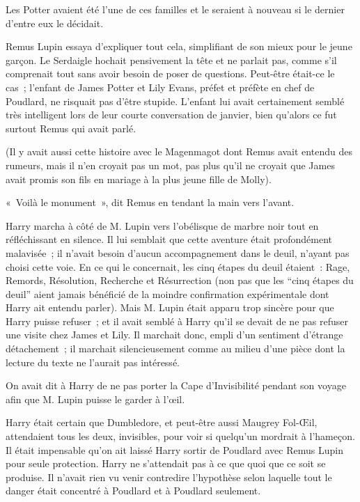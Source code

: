 Les Potter avaient été l'une de ces familles et le seraient à nouveau si le dernier d'entre eux le décidait.

Remus Lupin essaya d'expliquer tout cela, simplifiant de son mieux pour le jeune garçon. Le Serdaigle hochait pensivement la tête et ne parlait pas, comme s'il comprenait tout sans avoir besoin de poser de questions. Peut-être était-ce le cas~; l'enfant de James Potter et Lily Evans, préfet et préfète en chef de Poudlard, ne risquait pas d'être stupide. L'enfant lui avait certainement semblé très intelligent lors de leur courte conversation de janvier, bien qu'alors ce fut surtout Remus qui avait parlé.

(Il y avait aussi cette histoire avec le Magenmagot dont Remus avait entendu des rumeurs, mais il n'en croyait pas un mot, pas plus qu'il ne croyait que James avait promis son fils en mariage à la plus jeune fille de Molly).

«~Voilà le monument~», dit Remus en tendant la main vers l'avant.

\later

Harry marcha à côté de M. Lupin vers l'obélisque de marbre noir tout en réfléchissant en silence. Il lui semblait que cette aventure était profondément malavisée~; il n'avait besoin d'aucun accompagnement dans le deuil, n'ayant pas choisi cette voie. En ce qui le concernait, les cinq étapes du deuil étaient~: Rage, Remords, Résolution, Recherche et Résurrection (non pas que les “cinq étapes du deuil” aient jamais bénéficié de la moindre confirmation expérimentale dont Harry ait entendu parler). Mais M. Lupin était apparu trop sincère pour que Harry puisse refuser~; et il avait semblé à Harry qu'il se devait de ne pas refuser une visite chez James et Lily. Il marchait donc, empli d'un sentiment d'étrange détachement~; il marchait silencieusement comme au milieu d'une pièce dont la lecture du texte ne l'aurait pas intéressé.

On avait dit à Harry de ne pas porter la Cape d'Invisibilité pendant son voyage afin que M. Lupin puisse le garder à l'œil.

Harry était certain que Dumbledore, et peut-être aussi Maugrey Fol-Œil, attendaient tous les deux, invisibles, pour voir si quelqu'un mordrait à l'hameçon. Il était impensable qu'on ait laissé Harry sortir de Poudlard avec Remus Lupin pour seule protection. Harry ne s'attendait pas à ce que quoi que ce soit se produise. Il n'avait rien vu venir contredire l'hypothèse selon laquelle tout le danger était concentré à Poudlard et à Poudlard seulement.

